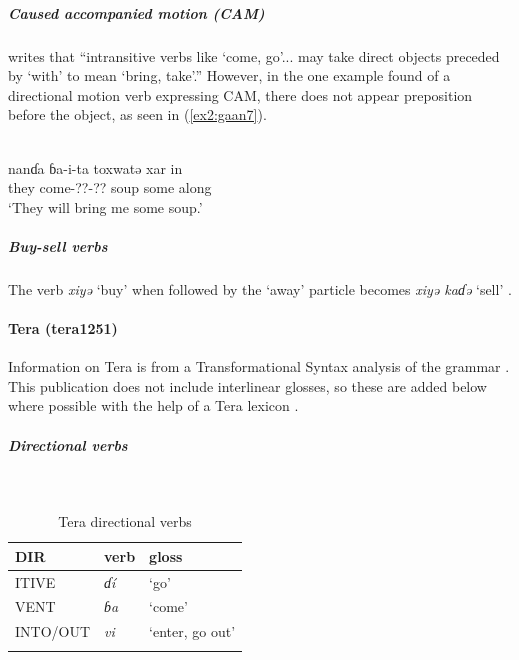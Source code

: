 \subparagraph{Caused accompanied motion (CAM)}

\citet[26]{newmanCaseGrammarGa1971} writes that ``intransitive verbs like `come, go'... may take direct objects preceded by `with' to mean `bring, take'.'' However, in the one example found of a directional motion verb expressing CAM, there does not appear preposition before the object, as seen in (\ref{ex2:gaan7}).

\ea\label{ex2:gaan7}
 \\
\gll nanɗa ɓa-i-ta toxwatə xar in \\
they come-??-?? soup some along \\
\glt `They will bring me some soup.'
\z 

\subparagraph{Buy-sell verbs}

The verb \textit{xiyə} `buy' when followed by the `away' particle becomes \textit{xiyə kaɗə} `sell' \citep[44]{newmanCaseGrammarGa1971}. 

\paragraph*{Tera (tera1251)} \label{tera}

Information on Tera is from a Transformational Syntax analysis of the grammar \citep{newmanGrammarTeraTransformational1970}. This publication does not include interlinear glosses, so these are added below where possible with the help of a Tera lexicon \citep{muazuModernTeraEnglish2015}.

\subparagraph{Directional verbs}~

\begin{table}[H]
	\caption{Tera directional verbs} 
	\label{tab:teraV}
	\begin{tabular}{lll} %
		\lsptoprule
		DIR & verb & gloss   \\ %
		\midrule
		ITIVE & \textit{ɗí} & `go' \\
		VENT & \textit{ɓa} & `come' \\
		INTO/OUT & \textit{vi} & `enter, go out' \\
		\lspbottomrule
	\end{tabular}
\end{table}


